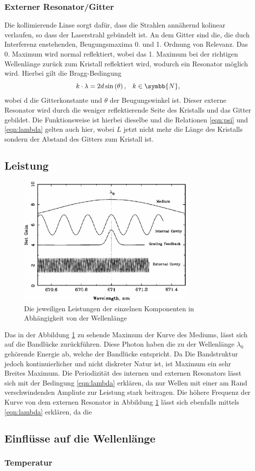 \subsubsection{Externer Resonator/Gitter}
\label{subsubsec:externeResonator}
Die kollimierende Linse sorgt dafür, dass die Strahlen annähernd kolinear verlaufen, so dass der Laserstrahl gebündelt ist.
An dem Gitter sind die, die duch Interferenz enstehenden, Beugungsmaxima 0. und 1. Ordnung von Relevanz.
Das 0. Maximum wird normal reflektiert, wobei das 1. Maximum bei der richtigen Wellenlänge zurück zum Kristall reflektiert wird, wodurch ein Resonator möglich wird.
Hierbei gilt die Bragg-Bedingung
\begin{equation}
   k \cdot \lambda = 2d \sin \left (  \theta \right ) , \; \; \; k \in \symbb{N} \label{eqn:bragg} ,
\end{equation}
wobei d die Gitterkonstante und $\theta$ der Beugungswinkel ist.
Dieser externe Resonator wird durch die weniger reflektierende Seite des Kristalls und das Gitter gebildet.
Die Funktionsweise ist hierbei dieselbe und die Relationen \ref{eqn:psi} und \ref{eqn:lambda} gelten auch hier, wobei $L$ jetzt nicht mehr die Länge des Kristalls sondern 
der Abstand des Gitters zum Kristall ist.
\subsection{Leistung}
\begin{figure}
    \centering
    \includegraphics[width = 0.78\textwidth]{pictures/gain.png}
    \caption{Die jeweiligen Leistungen der einzelnen Komponenten in Abhängigkeit von der Wellenlänge\cite{theorie}}
    \label{pic:gain}
\end{figure}
Das in der Abbildung \ref{pic:gain} zu sehende Maximum der Kurve des Mediums, lässt sich auf die Bandlücke zurückführen. Diese Photon haben die zu der Wellenlänge
$\lambda_0$ gehörende Energie ab, welche der Bandlücke entspricht. Da Die Bandstruktur jedoch kontinuierlicher und nicht diskreter Natur ist, ist Maximum ein sehr Breites Maximum.
Die Periodizität des internen und externen Resonators lässt sich mit der Bedingung \ref{eqn:lambda} erklären, da nur Wellen mit einer am Rand verschwindenden Ampliute zur Leistung stark beitragen.
Die höhere Frequenz der Kurve von dem externen Resonator in Abbildung \ref{pic:gain} lässt sich ebenfalls mittels \ref{eqn:lambda} erklären, da die 
 
\subsection{Einflüsse auf die Wellenlänge}
\subsubsection{Temperatur}